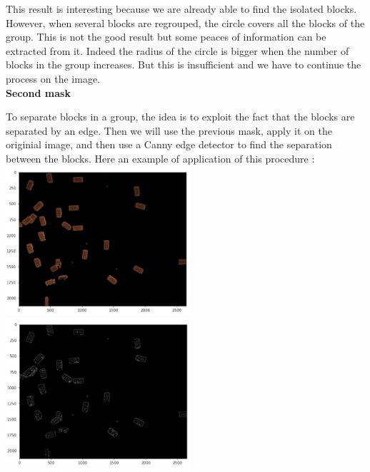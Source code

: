 \documentclass{article}
\begin{document}
This result is interesting because we are already able to find the isolated blocks. However, when several blocks are regrouped, the circle covers all the blocks of the group. This is not the good result but some peaces of information can be extracted from it. Indeed the radius of the circle is bigger when the number of blocks in the group increases. But this is insufficient and we have to continue the process on the image.\\

\textbf{Second mask}

To separate blocks in a group, the idea is to exploit the fact that the blocks are separated by an edge. Then we will use the previous mask, apply it on the originial image, and then use a Canny edge detector to find the separation between the blocks. Here an example of application of this procedure :\\
\includegraphics[width=6.8cm]{images/img27.png} 
\includegraphics[width=6.8cm]{images/img28.png}\\
\end{document}
